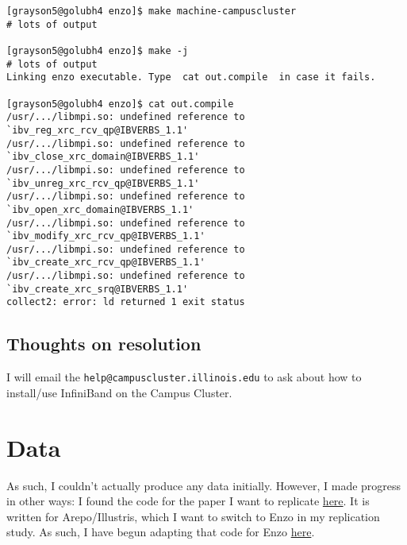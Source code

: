 \begin{verbatim}
[grayson5@golubh4 enzo]$ make machine-campuscluster
# lots of output

[grayson5@golubh4 enzo]$ make -j
# lots of output
Linking enzo executable. Type  cat out.compile  in case it fails.

[grayson5@golubh4 enzo]$ cat out.compile
/usr/.../libmpi.so: undefined reference to `ibv_reg_xrc_rcv_qp@IBVERBS_1.1'
/usr/.../libmpi.so: undefined reference to `ibv_close_xrc_domain@IBVERBS_1.1'
/usr/.../libmpi.so: undefined reference to `ibv_unreg_xrc_rcv_qp@IBVERBS_1.1'
/usr/.../libmpi.so: undefined reference to `ibv_open_xrc_domain@IBVERBS_1.1'
/usr/.../libmpi.so: undefined reference to `ibv_modify_xrc_rcv_qp@IBVERBS_1.1'
/usr/.../libmpi.so: undefined reference to `ibv_create_xrc_rcv_qp@IBVERBS_1.1'
/usr/.../libmpi.so: undefined reference to `ibv_create_xrc_srq@IBVERBS_1.1'
collect2: error: ld returned 1 exit status
\end{verbatim}

\subsection{Thoughts on resolution}

I will email the \texttt{help@campuscluster.illinois.edu} to ask about how to install/use InfiniBand on the Campus Cluster.

\section{Data}

As such, I couldn't actually produce any data initially. However, I made progress in other ways: I found the code for the paper I want to replicate \href{https://github.com/dschaurecker/dl_halo}{here}. It is written for Arepo/Illustris, which I want to switch to Enzo in my replication study. As such, I have begun adapting that code for Enzo \href{https://github.com/charmoniumQ/dl_halo}{here}.

